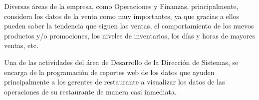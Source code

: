 Diversas áreas de la empresa, como Operaciones y Finanzas, principalmente, considera los datos de la venta como muy importantes, ya que gracias a ellos pueden saber la tendencia que siguen las ventas, el comportamiento de los nuevos productos y/o promociones, los niveles de inventarios, los días y horas de mayores ventas, etc. 

Una de las actividades del área de Desarrollo de la Dirección de Sistemas, se encarga de la programación de reportes web de los datos que ayuden principalmente a los gerentes de restaurante a visualizar los datos de las operaciones de su restaurante de manera casi inmediata.